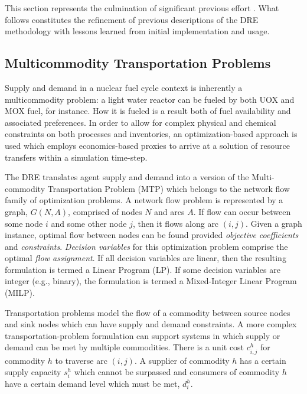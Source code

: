 This section represents the culmination of significant previous effort
\cite{gidden_agent-based_2013, gidden_agent-based_2014,
  gidden_agent-based_slc_2013}. What follows constitutes the refinement of
previous descriptions of the DRE methodology with lessons learned from initial
implementation and usage.

\subsection{Multicommodity Transportation Problems}\label{meth:mtp}

Supply and demand in a nuclear fuel cycle context is inherently a multicommodity
problem: a light water reactor can be fueled by both UOX and MOX fuel, for
instance. How it is fueled is a result both of fuel availability and associated
preferences. In order to allow for complex physical and chemical constraints on
both processes and inventories, an optimization-based approach is used which
employs economics-based proxies to arrive at a solution of resource transfers
within a simulation time-step.

The DRE translates agent supply and demand into a version of the Multi-commodity
Transportation Problem (MTP) \cite{even1975complexity} which belongs to the
network flow family of optimization problems. A network flow problem is
represented by a graph, $G(N, A)$, comprised of nodes $N$ and arcs $A$. If flow
can occur between some node $i$ and some other node $j$, then it flows along arc
$(i, j)$. Given a graph instance, optimal flow between nodes can be found
provided \textit{objective coefficients} and
\textit{constraints}. \textit{Decision variables} for this optimization problem
comprise the optimal \textit{flow assignment}. If all decision variables are
linear, then the resulting formulation is termed a Linear Program (LP). If some
decision variables are integer (e.g., binary), the formulation is termed a
Mixed-Integer Linear Program (MILP).

Transportation problems model the flow of a commodity between source nodes and
sink nodes which can have supply and demand constraints. A more complex
transportation-problem formulation can support systems in which supply or demand
can be met by multiple commodities.  There is a unit cost $c_{i,j}^{h}$ for
commodity $h$ to traverse arc $(i,j)$. A supplier of commodity $h$ has a certain
supply capacity $s_i^h$ which cannot be surpassed and consumers of commodity $h$
have a certain demand level which must be met, $d_i^h$.

